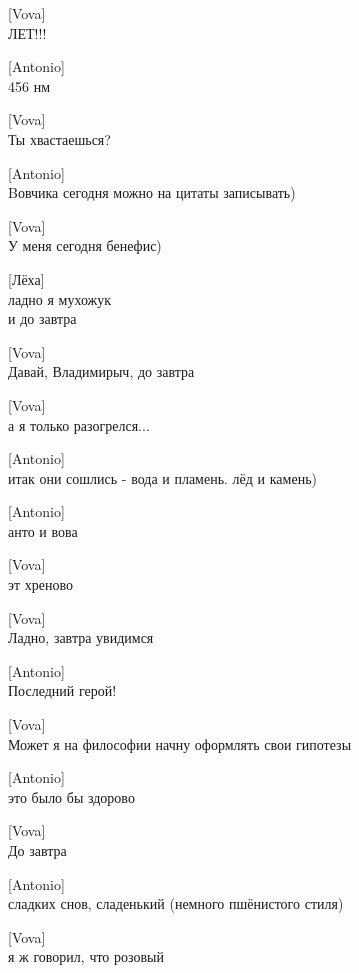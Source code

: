 [Vova]\\
ЛЕТ!!!


[Antonio]\\
456 нм


[Vova]\\
Ты хвастаешься?


[Antonio]\\
Bовчика сегодня можно на цитаты записывать)


[Vova]\\
У меня сегодня бенефис)


[Лёха]\\
ладно я мухожук\\
и до завтра


[Vova]\\
Давай, Владимирыч, до завтра


[Vova]\\
а я только разогрелся...


[Antonio]\\
итак они сошлись - вода и пламень. лёд и камень)


[Antonio]\\
анто и вова


[Vova]\\
эт хреново


[Vova]\\
Ладно, завтра увидимся


[Antonio]\\
Последний герой!


[Vova]\\
Может я на философии начну оформлять свои гипотезы


[Antonio]\\
это было бы здорово


[Vova]\\
До завтра


[Antonio]\\
сладких снов, сладенький (немного пшёнистого стиля)


[Vova]\\
я ж говорил, что розовый


{\small{}}


{\tiny{}}

